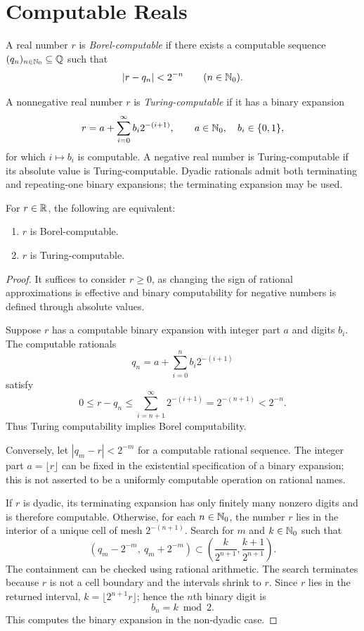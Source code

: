 \section{Computable Reals}

\begin{definition}
A real number $r$ is \emph{Borel-computable} if there exists a computable
sequence $(q_n)_{n\in\mathbb{N}_0}\subseteq\mathbb{Q}$ such that
\[
 |r-q_n|<2^{-n}\qquad(n\in\mathbb{N}_0).
\]
\end{definition}

\begin{definition}
A nonnegative real number $r$ is \emph{Turing-computable} if it has a binary
expansion
\[
 r=a+\sum_{i=0}^{\infty}b_i2^{-(i+1)},
 \qquad a\in\mathbb{N}_0, \quad b_i\in\{0, 1\},
\]
for which $i\mapsto b_i$ is computable. A negative real number is
Turing-computable if its absolute value is Turing-computable. Dyadic
rationals admit both terminating and repeating-one binary expansions;
the terminating expansion may be used.
\end{definition}

\begin{theorem}
For $r\in\mathbb{R}$, the following are equivalent:
\begin{enumerate}[label=(\roman*)]
 \item $r$ is Borel-computable.
 \item $r$ is Turing-computable.
\end{enumerate}
\end{theorem}
\begin{proof}
It suffices to consider $r\ge0$, as changing the sign of rational
approximations is effective and binary computability for negative
numbers is defined through absolute values.

Suppose $r$ has a computable binary expansion with integer part $a$ and
digits $b_i$. The computable rationals
\[
 q_n=a+\sum_{i=0}^{n}b_i2^{-(i+1)}
\]
satisfy
\[
 0\le r-q_n\le\sum_{i=n+1}^{\infty}2^{-(i+1)}
 =2^{-(n+1)}<2^{-n}.
\]
Thus Turing computability implies Borel computability.

Conversely, let $|q_m-r|<2^{-m}$ for a computable rational sequence.
The integer part $a=\lfloor r\rfloor$ can be fixed in the existential
specification of a binary expansion; this is not asserted to be a
uniformly computable operation on rational names.

If $r$ is dyadic, its terminating expansion has only finitely many
nonzero digits and is therefore computable. Otherwise, for each
$n\in\mathbb{N}_0$, the number $r$ lies in the interior of a unique cell
of mesh $2^{-(n+1)}$. Search for $m$ and $k\in\mathbb{N}_0$ such that
\[
 (q_m-2^{-m}, \ q_m+2^{-m})
 \subset\left(\frac{k}{2^{n+1}}, \frac{k+1}{2^{n+1}}\right).
\]
The containment can be checked using rational arithmetic. The search
terminates because $r$ is not a cell boundary and the intervals shrink
to $r$. Since $r$ lies in the returned interval,
$k=\lfloor 2^{n+1}r\rfloor$; hence the $n$th binary digit is
\[
 b_n=k\bmod 2.
\]
This computes the binary expansion in the non-dyadic case.
\end{proof}

